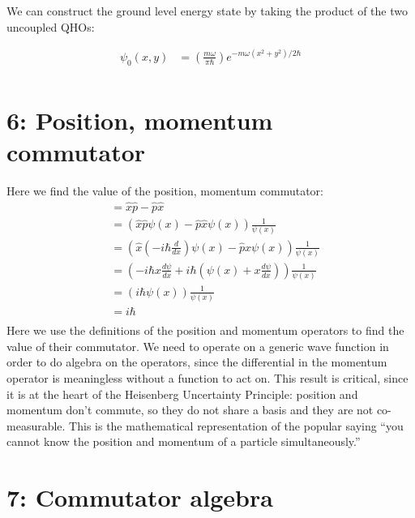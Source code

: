 \documentclass[10pt]{article} %
\begin{document}
We can construct the ground level energy state by taking the product of the two
uncoupled QHOs:

\begin{align*}
  \psi_0(x,y) &= \left(\frac{m\omega}{\pi\hbar}\right)
  e^{-m\omega\left(x^2+y^2\right)/2\hbar}\\
\end{align*}

\section{6: Position, momentum commutator}
Here we find the value of the position, momentum commutator:
\begin{align*}
  [\hat{x}, \hat{p}] &= \hat{x}\hat{p} - \hat{p}\hat{x}\\
  &= \left(\hat{x}\hat{p}\psi(x) - \hat{p}\hat{x}\psi(x)\right)\frac{1}{\psi(x)}\\
  &= \left(\hat{x}\left(-i\hbar\frac{d}{dx}\right)\psi(x) - \hat{p}x\psi(x)\right)\frac{1}{\psi(x)}\\
  &= \left(-i\hbar x \frac{d\psi}{dx} + i\hbar\left(\psi(x)
  + x\frac{d\psi}{dx}\right)\right)\frac{1}{\psi(x)}\\
  &= \left(i\hbar\psi(x)\right)\frac{1}{\psi(x)}\\
  &= i\hbar\\
\end{align*}
Here we use the definitions of the position and momentum operators to find the value of their
commutator. We need to operate on a generic wave function in order to do algebra on the
operators, since the differential in the momentum operator is meaningless without a function
to act on. This result is critical, since it is at the heart of the Heisenberg Uncertainty
Principle: position and momentum don't commute, so they do not share a basis and they are not
co-measurable. This is the mathematical representation of the popular saying ``you cannot know
the position and momentum of a particle simultaneously.''

\section{7: Commutator algebra}
\end{document}
